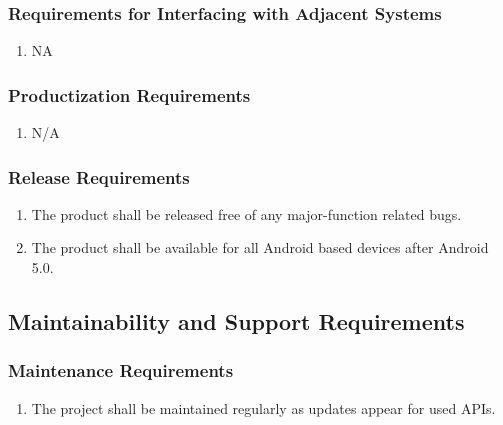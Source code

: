 \documentclass[12pt]{article}
\begin{document}
    \subsubsection{Requirements for Interfacing with Adjacent Systems}
    \label{ssub:requirements_for_interfacing_with_adjacent_systems}
    \begin{enumerate}[{OE-IAS}1. ]
        \item  NA
    \end{enumerate}
    
    \subsubsection{Productization Requirements}
    \label{ssub:productization_requirements}
    \begin{enumerate}[{OE-P}1. ]
        \item N/A
    \end{enumerate}
    
    \subsubsection{Release Requirements}
    \label{ssub:release_requirements}
    \begin{enumerate}[{OE-R}1. ]
        \item The product shall be released free of any major-function related bugs. 
        \item The product shall be available for all Android based devices after Android 5.0.
    \end{enumerate}
    
    
    \subsection{Maintainability and Support Requirements}
    \label{sub:maintainability_and_support_requirements}
    
    \subsubsection{Maintenance Requirements}
    \label{ssub:maintenance_requirements}
    \begin{enumerate}[{MS-M}1. ]
        \item The project shall be maintained regularly as updates appear for used APIs.
    \end{enumerate}
    
\end{document}
